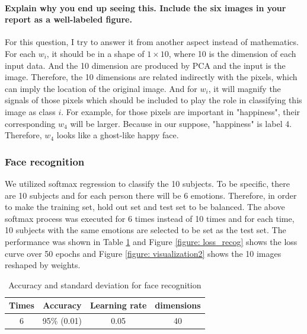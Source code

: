 \documentclass{article}
\begin{document}
\paragraph{Explain why you end up seeing this. Include the six images in your report as a well-labeled figure.} For this question, I try to answer it from another aspect instead of mathematics. For each $w_i$, it should be in a shape of $1\times10$, where 10 is the dimension of each input data. And the 10 dimension are produced by PCA and the input is the image. Therefore, the 10 dimensions are related indirectly with the pixels, which can imply the location of the original image. And for $w_i$, it will magnify the signals of those pixels which should be included to play the role in classifying this image as class $i$. For example, for those pixels are important in "happiness", their corresponding $w_4$ will be larger. Because in our suppose, "happiness" is label 4. Therefore, $w_4$ looks like a ghost-like happy face.
\subsubsection{Face recognition}
We utilized softmax regression to classify the 10 subjects. To be specific, there are 10 subjects and for each person there will be 6 emotions. Therefore, in order to make the training set, hold out set and test set to be balanced. The above softmax process was executed for 6 times instead of 10 times and for each time, 10 subjects with the same emotions are selected to be set as the test set. The performance was shown in Table \ref{table: face_recog} and Figure \ref{figure: loss_recog} shows the loss curve over 50 epochs and Figure \ref{figure: visualization2} shows the 10 images reshaped by weights.

\begin{table}[ht]
  \setlength{\tabcolsep}{9mm}
  \label{table: face_recog}
  \centering
  \begin{tabular}{c|c|c|c}
    \toprule
    \cmidrule(r){1-4}
    Times     &Accuracy&Learning rate&dimensions \\
    \midrule
    6  &95\% (0.01)&0.05&40\\
    \bottomrule
  \end{tabular}
  \caption{Accuracy and standard deviation for face recognition}
\end{table}
\end{document}
